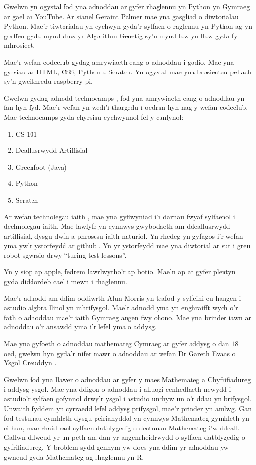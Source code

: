Gwelwn yn ogystal fod yna adnoddau ar gyfer rhaglennu yn Python yn Gymraeg ar gael ar YouTube. Ar sianel Geraint Palmer mae yna gasgliad o diwtorialau Python. Mae'r tiwtorialau yn cychwyn gyda'r sylfaen o raglennu yn Python ag yn gorffen gyda mynd dros yr Algorithm Genetig sy'n mynd law yn llaw gyda fy mhrosiect.

Mae'r wefan codeclub gydag amrywiaeth eang o adnoddau i godio. Mae yna gyrsiau ar HTML, CSS, Python a Scratch. Yn ogystal mae yna brosiectau pellach sy'n gweithredu raspberry pi. 

Gwelwn gydag adnodd technocamps \cite{technocamps}, fod yna amrywiaeth eang o adnoddau yn fan hyn fyd. Mae'r wefan yn wedi'i thargedu i oedran hyn nag y wefan codeclub. Mae technocamps gyda chyrsiau cychwynnol fel y canlynol:

\begin{enumerate}
	\item CS 101
	\item Deallusrwydd Artiffisial
	\item Greenfoot (Java)
	\item Python
	\item Scratch
\end{enumerate} 

Ar wefan technolegau iaith \cite{technolegau-iaith}, mae yna gyflwyniad i'r darnau fwyaf sylfaenol i dechnolegau iaith. Mae lawlyfr yn cynnwys gwybodaeth am ddeallusrwydd artiffisial, dysgu dwfn a phrosesu iaith naturiol. Yn rhedeg yn gyfagos i'r wefan yma yw'r ystorfeydd ar github \cite{github-technolegauiaith}. Yn yr ystorfeydd mae yna diwtorial ar sut i greu robot sgwrsio drwy ``turing test lessons''. 

Yn y siop ap apple, fedrem lawrlwytho'r ap botio. Mae'n ap ar gyfer plentyn gyda diddordeb cael i mewn i rhaglennu.

Mae'r adnodd am ddim oddiwrth Alun Morris \cite{Algebra-llinol} yn trafod y sylfeini eu hangen i astudio algbra llinol yn mhrifysgol. Mae'r adnodd yma yn enghraifft wych o'r fath o adnoddau mae'r iaith Gymraeg angen fwy ohono. Mae yna brinder iawn ar adnoddau o'r ansawdd yma i'r lefel yma o addysg. 

Mae yna gyfoeth o adnoddau mathemateg Cymraeg ar gyfer addysg o dan $18$ oed, gwelwn hyn gyda'r nifer mawr o adnoddau ar wefan Dr Gareth Evans o Ysgol Creuddyn \cite{mathemateg}.  

Gwelwn fod yna llawer o adnoddau ar gyfer y maes Mathemateg a Chyfrifiadureg i addysg ysgol. Mae yna ddigon o adnoddau i alluogi cenhedlaeth newydd i astudio'r sylfaen gofynnol drwy'r ysgol i astudio unrhyw un o'r ddau yn brifysgol. Unwaith fyddem yn cyrraedd lefel addysg prifysgol, mae'r prinder yn amlwg. Gan fod testunau cymhleth dysgu peirianyddol yn cynnwys Mathemateg gymhleth yn ei hun, mae rhaid cael sylfaen datblygedig o destunau Mathemateg i'w ddeall. Gallwn ddweud yr un peth am dan yr angenrheidrwydd o sylfaen datblygedig o gyfrifiadureg. Y broblem sydd gennym yw does yna ddim yr adnoddau yw gwneud gyda Mathemateg ag rhaglennu yn R.

